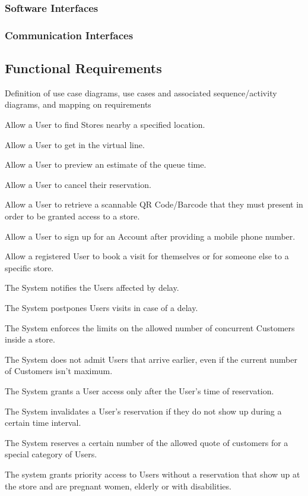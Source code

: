\subsubsection{Software Interfaces}
\subsubsection{Communication Interfaces}

\subsection{Functional Requirements}
Definition of use case diagrams, use cases and associated
sequence/activity diagrams, and mapping on requirements

\begin{enumerate}[label={[R\arabic*]}]
    \item Allow a User to find Stores nearby a specified location.
    \item Allow a User to get in the virtual line.
    \item Allow a User to preview an estimate of the queue time.
    \item Allow a User to cancel their reservation.
    \item Allow a User to retrieve a scannable QR Code/Barcode that they must present in order to be granted access to a store.
    \item Allow a User to sign up for an Account after providing a mobile phone number.
    \item Allow a registered User to book a visit for themselves or for someone else to a specific store.

    \item The System notifies the Users affected by delay.
    \item The System postpones Users visits in case of a delay.
    \item The System enforces the limits on the allowed number of concurrent Customers inside a store.
    \item The System does not admit Users that arrive earlier, even if the current number of Customers isn't maximum.
    \item The System grants a User access only after the User's time of reservation.
    \item The System invalidates a User's reservation if they do not show up during a certain time interval.
    \item The System reserves a certain number of the allowed quote of customers for a special category of Users.
    \item The system grants priority access to Users without a reservation that show up at the store and are pregnant women, elderly or with disabilities.
    

\end{enumerate}
